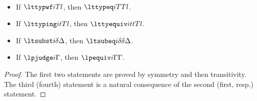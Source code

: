 \begin{lemma}[Reflexivity] $ $
  \begin{itemize}
  \item If $\lttypwf i T l$, then $\lttypeq i T T l$.
  \item If $\lttyping i t T l$, then $\lttyequiv i t t T l$.
  \item If $\ltsubst i \delta \Delta$, then $\ltsubeq i \delta \delta \Delta$. 
  \item If $\lpjudge i \Gamma$, then $\lpequiv i \Gamma \Gamma$.
  \end{itemize}
\end{lemma}
\begin{proof}
  The first two statements are proved by symmetry and then transitivity. %
  The third (fourth) statement is a natural consequence of the second (first, resp.) statement. 
\end{proof}


